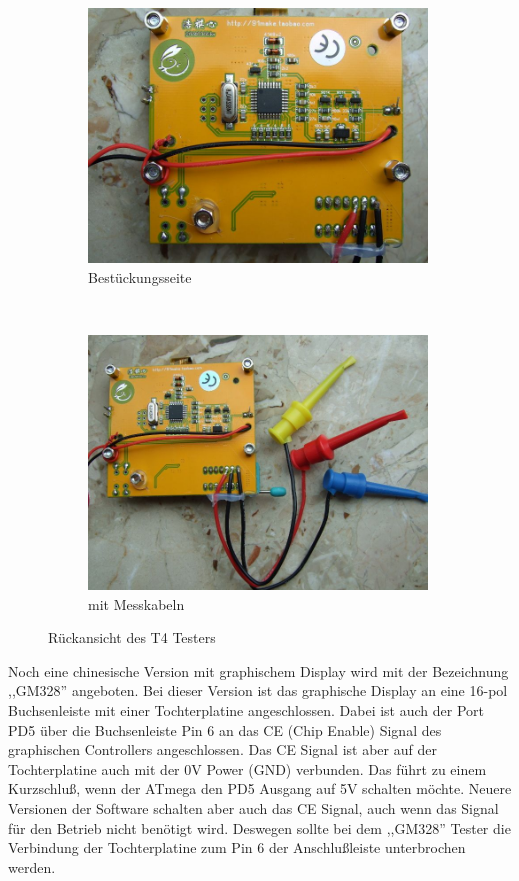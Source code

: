\begin{figure}[H]
  \begin{subfigure}[b]{9cm}
    \centering
    \includegraphics[width=9cm]{../PNG/T4_back.JPG}
    \caption{Bestückungsseite}
  \end{subfigure}
  ~
  \begin{subfigure}[b]{9cm}
    \centering
    \includegraphics[width=9cm]{../PNG/T4_back_clips.JPG}
    \caption{mit Messkabeln}
  \end{subfigure}
  \caption{Rückansicht des T4 Testers}
  \label{fig:T4_back}
\end{figure}

Noch eine chinesische Version mit graphischem Display wird mit der Bezeichnung ,,GM328'' angeboten.
Bei dieser Version ist das graphische Display an eine 16-pol Buchsenleiste mit einer Tochterplatine
angeschlossen.
Dabei ist auch der Port PD5 über die Buchsenleiste Pin 6 an das CE (Chip Enable) Signal
des graphischen Controllers angeschlossen. Das CE Signal ist aber auf der Tochterplatine auch mit der
0V Power (GND) verbunden.
Das führt zu einem Kurzschluß, wenn der ATmega den PD5 Ausgang auf 5V schalten möchte.
Neuere Versionen der Software schalten aber auch das CE Signal, auch wenn das Signal für den Betrieb nicht
benötigt wird.
Deswegen sollte bei dem ,,GM328'' Tester die Verbindung der Tochterplatine zum Pin 6 
der Anschlußleiste unterbrochen werden.

